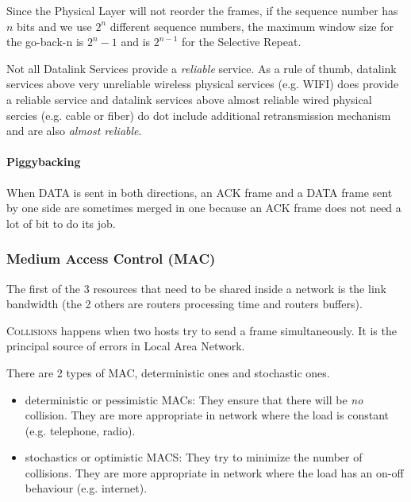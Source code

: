 Since the Physical Layer will not reorder the frames,
if the sequence number has $n$ bits and we use $2^n$ different sequence numbers,
the maximum window size for the go-back-n is $2^n-1$ and is $2^{n-1}$ for the Selective Repeat.

Not all Datalink Services provide a \emph{reliable} service.
As a rule of thumb, datalink services above very unreliable wireless physical services (e.g. WIFI) does
provide a reliable service and datalink services above almost reliable wired physical sercies (e.g. cable or fiber)
do dot include additional retransmission mechanism and are also \emph{almost reliable}.

\paragraph{Piggybacking}
When DATA is sent in both directions, an ACK frame and a DATA frame sent by one side are sometimes merged in one
because an ACK frame does not need a lot of bit to do its job.


\subsubsection{Medium Access Control (MAC)}
The first of the 3 resources that need to be shared inside a network is the link bandwidth (the 2 others are routers processing time and routers buffers).

\textsc{Collisions} happens when two hosts try to send a frame simultaneously.
It is the principal source of errors in Local Area Network.

There are 2 types of MAC, deterministic ones and stochastic ones.
\begin{itemize}
  \item deterministic or pessimistic MACs: They ensure that there will be \emph{no} collision.
    They are more appropriate in network where the load is constant (e.g. telephone, radio).
  \item stochastics or optimistic MACS: They try to minimize the number of collisions.
    They are more appropriate in network where the load has an on-off behaviour (e.g. internet).
\end{itemize}

